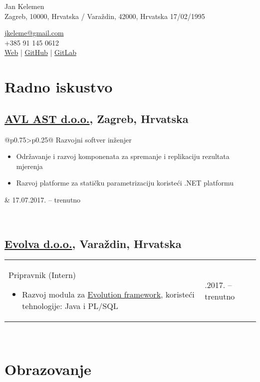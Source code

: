 \documentclass[a4paper]{article}
\makeatletter
\newlength{\tablewidth}
\newenvironment{period}[2]{%
\newcommand{\sarma}{#2}%
\setlength{\tablewidth}{\linewidth}
\addtolength{\tablewidth}{-2\tabcolsep}
\begin{tabular}{@{}p{0.75\tablewidth}>{\raggedleft\arraybackslash}p{0.25\tablewidth}@{}}%
#1 \newline
\begin{itemize}
}{%
\end{itemize} & \sarma \\%
\end{tabular}\\
}
\makeatother
\begin{document}
\fontfamily{\sfdefault}
\selectfont

\begin{minipage}{.5\textwidth}
\LARGE{Jan Kelemen}\\
\normalsize{Zagreb, 10000, Hrvatska / Vara\v{z}din, 42000, Hrvatska}
\normalsize{17/02/1995}
\end{minipage}%
\begin{minipage}{.5\textwidth}
\raggedleft
\href{mailto:jkeleme@gmail.com}{jkeleme@gmail.com} \\
+385 91 145 0612 \\
\href{http://jan-kelemen.github.io/}{Web} | \href{https://github.com/jan-kelemen}{GitHub} | \href{https://gitlab.com/jan-kelemen}{GitLab}
\end{minipage}

\vspace{1em}

\section{Radno iskustvo}
\subsection{\href{https://www.avl.com/}{AVL AST d.o.o.}, Zagreb, Hrvatska}
\begin{period}{Razvojni softver in\v{z}enjer}{17.07.2017. -- trenutno}
        \item
                Odr\v{z}avanje i razvoj komponenata za spremanje i replikaciju rezultata mjerenja
	\item
		Razvoj platforme za stati\v{c}ku parametrizaciju koriste\'{c}i .NET platformu
\end{period}
\subsection{\href{http://www.evolva.hr/hr/index.html}{Evolva d.o.o.}, Vara\v{z}din, Hrvatska}
\begin{period}{Pripravnik (Intern)}{22.08.2016. -- 23.09.2016.}
	\item
		Razvoj modula za \href{http://www.evolution-framework.com/}{Evolution framework}, koriste\'{c}i tehnologije: Java i PL/SQL
\end{period}

\section{Obrazovanje}
\end{document}
